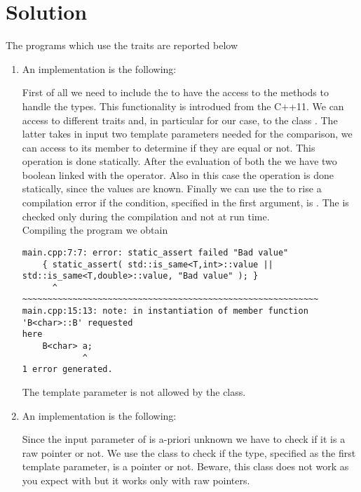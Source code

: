 \section*{Solution}

%    

The programs which use the traits are reported below

\begin{enumerate}

    \item An implementation is the following:
    \lstset{basicstyle=\scriptsize\sf}
    
    \lstset{basicstyle=\sf}
    First of all we need to include the  to have the access to
    the methods to handle the types. This functionality is introdued from the C++11.
    We can access to different traits and, in particular for our case, to the class
    . The latter takes in input two template parameters needed for
    the comparison, we can access to its member  to determine if they
    are equal or not.  This operation is done statically. After the evaluation of
    both the  we have two boolean linked with the \cpp{||}
    operator.  Also in this case the operation is done statically, since the
    values
    are known.  Finally we can use the  to rise a compilation
    error if the condition, specified in the first argument, is .
    The  is checked only during the compilation and not at
    run time. \\
    Compiling the program we obtain
    \begin{verbatim}
main.cpp:7:7: error: static_assert failed "Bad value"
    { static_assert( std::is_same<T,int>::value ||
std::is_same<T,double>::value, "Bad value" ); }
      ^              ~~~~~~~~~~~~~~~~~~~~~~~~~~~~~~~~~~~~~~~~~~~~~~~~~~~~~~~~~~~
main.cpp:15:13: note: in instantiation of member function 'B<char>::B' requested
here
    B<char> a;
            ^
1 error generated.
    \end{verbatim}
    The template parameter  is not allowed by the class.

    \item An implementation is the following:
    \lstset{basicstyle=\scriptsize\sf}
    
    \lstset{basicstyle=\sf}
    Since the input parameter of  is a-priori unknown we have to
    check if it is a raw pointer or not. We use the class 
    to check if the type, specified as the first template parameter, is a
    pointer or not.
    Beware, this class does not work as you expect with 
    but it works only with raw pointers.


\end{enumerate}
